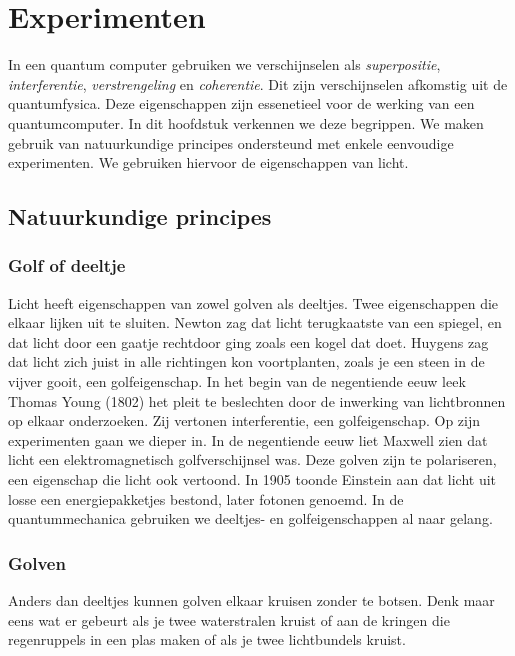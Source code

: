 \documentclass[../../main.tex]{subfiles}
\begin{document}
\onlyinsubfile{\setcounter{chapter}{8}}
\notinsubfile{}
\chapter{Experimenten}
\onlyinsubfile{
\marginpar{\vspace{0cm}
\textcolor{red}{ hoofdstuk is los gecompileerd, hstk nummer is 1}}
}
In een quantum computer gebruiken we verschijnselen als \textit{superpositie}, \textit{interferentie}, \textit{verstrengeling} en \textit{coherentie}. Dit zijn verschijnselen afkomstig uit de quantumfysica. Deze eigenschappen zijn essenetieel voor de werking van een quantumcomputer. In dit hoofdstuk verkennen we deze begrippen. We maken gebruik van natuurkundige principes ondersteund met enkele eenvoudige experimenten. We gebruiken hiervoor de eigenschappen van licht.

\section{Natuurkundige principes}

\subsection{Golf of deeltje}
Licht heeft eigenschappen van zowel golven als deeltjes. Twee eigenschappen die elkaar lijken uit te sluiten. Newton zag dat licht terugkaatste van een spiegel, en dat licht door een gaatje rechtdoor ging zoals een kogel dat doet. Huygens zag dat licht zich juist in alle richtingen kon voortplanten, zoals je een steen in de vijver gooit, een golfeigenschap. In het begin van de negentiende eeuw leek Thomas Young (1802) het pleit te beslechten door de inwerking van lichtbronnen op elkaar onderzoeken. Zij vertonen interferentie, een golfeigenschap. Op zijn experimenten gaan we dieper in. In de negentiende eeuw liet Maxwell zien dat licht een elektromagnetisch golfverschijnsel was. Deze golven zijn te polariseren, een eigenschap die licht ook vertoond. In 1905 toonde Einstein aan dat licht uit losse een energiepakketjes bestond, later fotonen genoemd. In de quantummechanica gebruiken we deeltjes- en golfeigenschappen al naar gelang.

\subsection*{Golven}
Anders dan deeltjes kunnen golven elkaar kruisen zonder te botsen. Denk maar eens wat er gebeurt als je twee waterstralen kruist of aan de kringen die regenruppels in een plas maken of als je twee lichtbundels kruist. 
\end{document}
